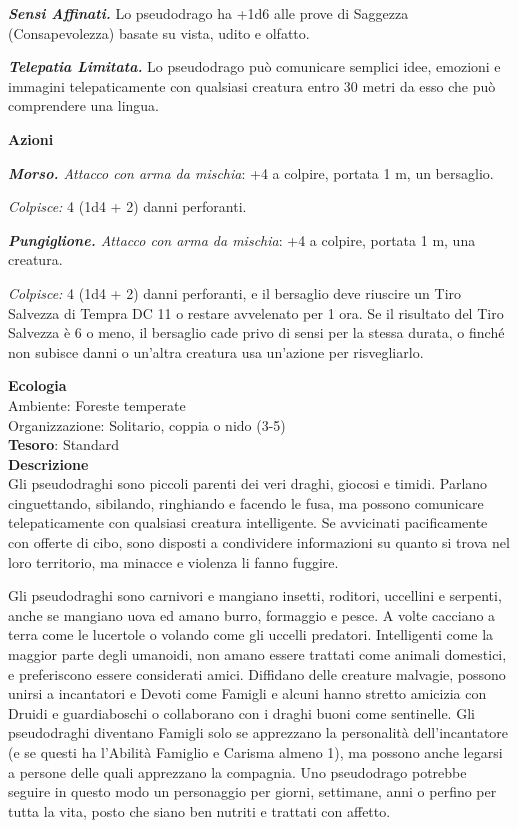 \begin{multicols}{2}
\textit{\textbf{Sensi Affinati.}} Lo pseudodrago ha +1d6 alle prove di Saggezza (Consapevolezza) basate su vista, udito e olfatto.

\textit{\textbf{Telepatia Limitata.}} Lo pseudodrago può comunicare semplici idee, emozioni e immagini telepaticamente con qualsiasi creatura entro 30 metri da esso che può comprendere una lingua.

\textbf{Azioni}

\textit{\textbf{Morso.} Attacco con arma da mischia}: +4 a colpire, portata 1 m, un bersaglio.

\textit{Colpisce:} 4 (1d4 + 2) danni perforanti.

\textit{\textbf{Pungiglione.} Attacco con arma da mischia}: +4 a colpire, portata 1 m, una creatura.

\textit{Colpisce:} 4 (1d4 + 2) danni perforanti, e il bersaglio deve riuscire un Tiro Salvezza di Tempra DC 11 o restare avvelenato per 1 ora. Se il risultato del Tiro Salvezza è 6 o meno, il bersaglio cade privo di sensi per la stessa durata, o finché non subisce danni o un'altra creatura usa un'azione per risvegliarlo.

\textbf{Ecologia}\\
Ambiente: Foreste temperate\\
Organizzazione: Solitario, coppia o nido (3-5)\\
\textbf{Tesoro}: Standard\\
\textbf{Descrizione}\\
Gli pseudodraghi sono piccoli parenti dei veri draghi, giocosi e timidi. Parlano cinguettando, sibilando, ringhiando e facendo le fusa, ma possono comunicare telepaticamente con qualsiasi creatura intelligente. Se avvicinati pacificamente con offerte di cibo, sono disposti a condividere informazioni su quanto si trova nel loro territorio, ma minacce e violenza li fanno fuggire.

Gli pseudodraghi sono carnivori e mangiano insetti, roditori, uccellini e serpenti, anche se mangiano uova ed amano burro, formaggio e pesce. A volte cacciano a terra come le lucertole o volando come gli uccelli predatori. Intelligenti come la maggior parte degli umanoidi, non amano essere trattati come animali domestici, e preferiscono essere considerati amici. Diffidano delle creature malvagie, possono unirsi a incantatori e Devoti come Famigli e alcuni hanno stretto amicizia con Druidi e guardiaboschi o collaborano con i draghi buoni come sentinelle. Gli pseudodraghi diventano Famigli solo se apprezzano la personalità dell'incantatore (e se questi ha l'Abilità Famiglio e Carisma almeno 1), ma possono anche legarsi a persone delle quali apprezzano la compagnia. Uno pseudodrago potrebbe seguire in questo modo un personaggio per giorni, settimane, anni o perfino per tutta la vita, posto che siano ben nutriti e trattati con affetto.


\end{multicols}
